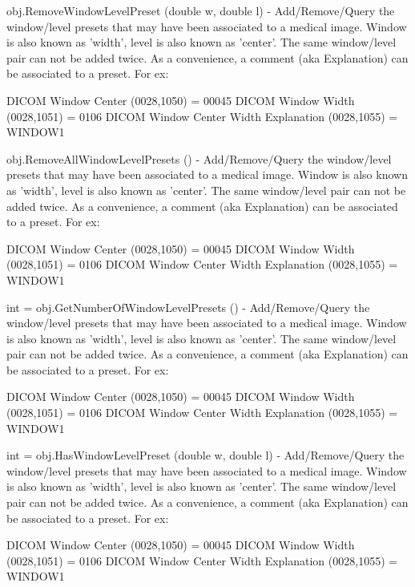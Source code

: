 \begin{DoxyItemize}
\item {\ttfamily obj.\-Remove\-Window\-Level\-Preset (double w, double l)} -\/ Add/\-Remove/\-Query the window/level presets that may have been associated to a medical image. Window is also known as 'width', level is also known as 'center'. The same window/level pair can not be added twice. As a convenience, a comment (aka Explanation) can be associated to a preset. For ex\-: \begin{DoxyVerb}         DICOM Window Center (0028,1050) = 00045
         DICOM Window Width  (0028,1051) = 0106
         DICOM Window Center Width Explanation (0028,1055) = WINDOW1\end{DoxyVerb}
  
\item {\ttfamily obj.\-Remove\-All\-Window\-Level\-Presets ()} -\/ Add/\-Remove/\-Query the window/level presets that may have been associated to a medical image. Window is also known as 'width', level is also known as 'center'. The same window/level pair can not be added twice. As a convenience, a comment (aka Explanation) can be associated to a preset. For ex\-: \begin{DoxyVerb}         DICOM Window Center (0028,1050) = 00045
         DICOM Window Width  (0028,1051) = 0106
         DICOM Window Center Width Explanation (0028,1055) = WINDOW1\end{DoxyVerb}
  
\item {\ttfamily int = obj.\-Get\-Number\-Of\-Window\-Level\-Presets ()} -\/ Add/\-Remove/\-Query the window/level presets that may have been associated to a medical image. Window is also known as 'width', level is also known as 'center'. The same window/level pair can not be added twice. As a convenience, a comment (aka Explanation) can be associated to a preset. For ex\-: \begin{DoxyVerb}         DICOM Window Center (0028,1050) = 00045
         DICOM Window Width  (0028,1051) = 0106
         DICOM Window Center Width Explanation (0028,1055) = WINDOW1\end{DoxyVerb}
  
\item {\ttfamily int = obj.\-Has\-Window\-Level\-Preset (double w, double l)} -\/ Add/\-Remove/\-Query the window/level presets that may have been associated to a medical image. Window is also known as 'width', level is also known as 'center'. The same window/level pair can not be added twice. As a convenience, a comment (aka Explanation) can be associated to a preset. For ex\-: \begin{DoxyVerb}         DICOM Window Center (0028,1050) = 00045
         DICOM Window Width  (0028,1051) = 0106
         DICOM Window Center Width Explanation (0028,1055) = WINDOW1\end{DoxyVerb}
  

\end{DoxyItemize}
